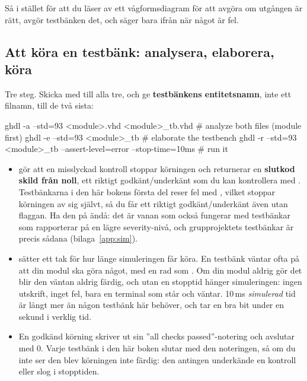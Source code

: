 Så i stället för att du läser av ett vågformsdiagram för att avgöra om utgången är rätt, avgör
testbänken det, och säger bara ifrån när något är fel.

\subsection{Att köra en testbänk: analysera, elaborera, köra}
\label{c2:sub:run}
Tre steg. Skicka med  till alla tre, och ge \textbf{testbänkens entitetsnamn}, inte
ett filnamn, till de två sista:

\begin{shell}
ghdl -a --std=93 <module>.vhd <module>_tb.vhd        # analyze both files (module first)
ghdl -e --std=93 <module>_tb                         # elaborate the testbench
ghdl -r --std=93 <module>_tb --assert-level=error --stop-time=10ms   # run it
\end{shell}

\begin{itemize}
  \item {} gör att en misslyckad kontroll stoppar körningen och returnerar
    en \textbf{slutkod skild från noll}, ett riktigt godkänt/underkänt som du kan kontrollera med
    . Testbänkarna i den här bokens första del reser fel med ,
    vilket stoppar körningen av sig självt, så du får ett riktigt godkänt/underkänt även utan
    flaggan. Ha den på ändå: det är vanan som också fungerar med testbänkar som rapporterar på en
    lägre severity-nivå, och grupprojektets testbänkar är precis sådana (bilaga~\ref{app:sim}).
  \item {} sätter ett tak för hur länge simuleringen får köra. En testbänk
    väntar ofta på att din modul ska göra något, med en rad som . Om din
    modul aldrig gör det blir den väntan aldrig färdig, och utan en stopptid hänger simuleringen:
    ingen utskrift, inget fel, bara en terminal som står och väntar. 10\,ms \emph{simulerad} tid
    är långt mer än någon testbänk här behöver, och tar en bra bit under en sekund i verklig tid.
  \item En godkänd körning skriver ut sin ”all checks passed”-notering och avslutar med 0. Varje
    testbänk i den här boken slutar med den noteringen, så om du inte ser den blev körningen inte
    färdig: den antingen underkände en kontroll eller slog i stopptiden.
\end{itemize}

